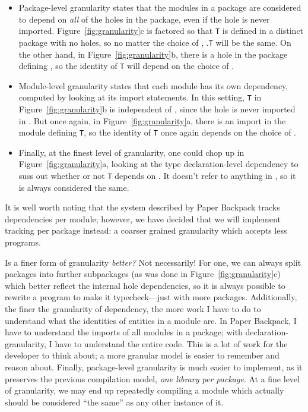 \documentclass{article}
\begin{document}
\begin{itemize}
    \item Package-level granularity states that the modules in a package are
considered to depend on \emph{all} of the holes in the package, even if
the hole is never imported.  Figure~\ref{fig:granularity}c is factored so that
\verb|T| is defined in a distinct package  with no holes, so no matter
the choice of , .\verb|T| will be the same.  On the other hand, in
Figure~\ref{fig:granularity}b, there is a hole in the package defining ,
so the identity of \verb|T| will depend on the choice of .

\item Module-level granularity states that each module has its own dependency,
computed by looking at its import statements.  In this setting, \verb|T| in Figure~\ref{fig:granularity}b
is independent of , since the hole is never imported in .  But once again, in
Figure~\ref{fig:granularity}a, there is an import in the module defining \verb|T|,
so the identity of \verb|T| once again depends on the choice of .

\item Finally, at the finest level of granularity, one could chop up  in
Figure~\ref{fig:granularity}a, looking at the type declaration-level dependency
to suss out whether or not \verb|T| depends on .  It doesn't refer to
anything in , so it is always considered the same.
\end{itemize}

It is well worth noting that the system described by Paper Backpack tracks dependencies per module;
however, we have decided that we will implement tracking per package instead:
a coarser grained granularity which accepts less programs.

Is a finer form of granularity \emph{better?} Not necessarily!  For
one, we can always split packages into further subpackages (as was done
in Figure~\ref{fig:granularity}c) which better reflect the internal hole
dependencies, so it is always possible to rewrite a program to make it
typecheck---just with more packages.  Additionally, the finer the
granularity of dependency, the more work I have to do to understand what
the identities of entities in a module are.  In Paper Backpack, I have
to understand the imports of all modules in a package; with
declaration-granularity, I have to understand the entire code.  This is
a lot of work for the developer to think about; a more granular model is
easier to remember and reason about.  Finally, package-level granularity
is much easier to implement, as it preserves the previous compilation
model, \emph{one library per package}.  At a fine level of granularity, we
may end up repeatedly compiling a module which actually should be considered
``the same'' as any other instance of it.
\end{document}
